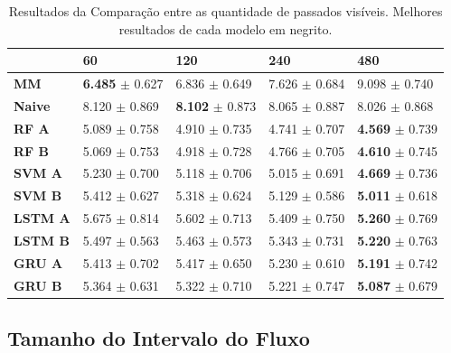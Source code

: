 \begin{table}[htbp]
    \begin{tabular*}{\linewidth}{@{\extracolsep{\fill}}lllll}
    \toprule
     & 
    \multicolumn{1}{l}{\textbf{60}} & 
    \multicolumn{1}{l}{\textbf{120}} &
    \multicolumn{1}{l}{\textbf{240}} &
    \multicolumn{1}{l}{\textbf{480}} \\
    \midrule
    \textbf{MM} & \textbf{6.485} $\pm$ 0.627 & 6.836 $\pm$ 0.649 & 7.626 $\pm$ 0.684 & 9.098 $\pm$ 0.740
    \\
    \midrule
    \textbf{Naive} & 8.120 $\pm$ 0.869 & \textbf{8.102} $\pm$ 0.873 & 8.065 $\pm$ 0.887 & 8.026 $\pm$ 0.868 
    \\
    \midrule
    \textbf{RF A} & 5.089 $\pm$ 0.758 & 4.910 $\pm$ 0.735 & 4.741 $\pm$ 0.707 & \textbf{4.569} $\pm$ 0.739 
    \\
    \midrule
    \textbf{RF B} & 5.069 $\pm$ 0.753 & 4.918 $\pm$ 0.728 & 4.766 $\pm$ 0.705 & \textbf{4.610} $\pm$ 0.745 
    \\
    \midrule
    \textbf{SVM A} & 5.230 $\pm$ 0.700 & 5.118 $\pm$ 0.706 & 5.015 $\pm$ 0.691 & \textbf{4.669} $\pm$ 0.736 
    \\
    \midrule
    \textbf{SVM B} & 5.412 $\pm$ 0.627 & 5.318 $\pm$ 0.624 & 5.129 $\pm$ 0.586 & \textbf{5.011} $\pm$ 0.618 
    \\
    \midrule
    \textbf{LSTM A} & 5.675 $\pm$ 0.814 & 5.602 $\pm$ 0.713 & 5.409 $\pm$ 0.750 & \textbf{5.260} $\pm$ 0.769 
    \\
    \midrule
    \textbf{LSTM B} & 5.497 $\pm$ 0.563 & 5.463 $\pm$ 0.573 & 5.343 $\pm$ 0.731 & \textbf{5.220} $\pm$ 0.763 
    \\
    \midrule
    \textbf{GRU A} & 5.413 $\pm$ 0.702 & 5.417 $\pm$ 0.650 & 5.230 $\pm$ 0.610 & \textbf{5.191} $\pm$ 0.742 
    \\
    \midrule
    \textbf{GRU B} & 5.364 $\pm$ 0.631 & 5.322 $\pm$ 0.710 & 5.221 $\pm$ 0.747 & \textbf{5.087} $\pm$ 0.679
    \\
    \bottomrule
    \end{tabular*}
    \label{table:res_past}
    \caption{Resultados da Comparação entre as quantidade de passados visíveis. Melhores resultados de cada modelo em negrito.}
\end{table}
 
\subsection{Tamanho do Intervalo do Fluxo}

